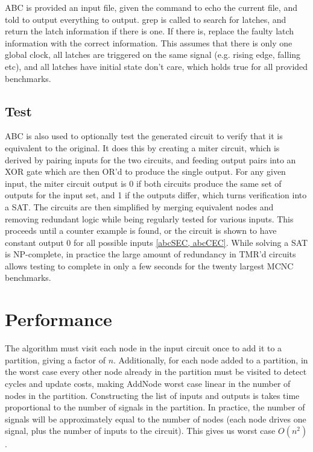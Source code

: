 \documentclass[12pt,final,oneside]{dwThesis} %
\begin{document}
   \gls{ABC} is provided an input file, given the command to echo the current
   file, and told to output everything to output.  grep is called to search for
   latches, and return the latch information if there is one. If there is,
   replace the faulty latch information with the correct information.  This
   assumes that there is only one global clock, all latches are triggered on
   the same signal (e.g. rising edge, falling etc), and all latches have
   initial state don't care, which holds true for all provided benchmarks.


   \subsection{Test}
   \label{algTest} \gls{ABC} is also used to optionally test
   the generated circuit to verify that it is equivalent to the original. It
   does this by creating a miter circuit, which is derived by pairing inputs
   for the two circuits, and feeding output pairs into an XOR gate which are
   then OR'd to produce the single output. For any given input, the miter
   circuit output is 0 if both circuits produce the same set of outputs for the
   input set, and 1 if the outputs differ, which turns verification into a
   \gls{SAT}.  The circuits are then simplified by merging equivalent nodes and
   removing redundant logic while being regularly tested for various inputs.
   This proceeds until a counter example is found, or the circuit is shown to
   have constant output 0 for all possible inputs \ref{abcSEC, abcCEC}.  While
   solving a \gls{SAT} is NP-complete, in practice the large amount of
   redundancy in \gls{TMR}'d circuits allows testing to complete in only a few
   seconds for the twenty largest \gls{MCNC} benchmarks.


   \section{Performance}
   The algorithm must visit each node in the input
   circuit once to add it to a partition, giving a factor of $n$.
   Additionally, for each node added to a partition, in the worst case every
   other node already in the partition must be visited to detect cycles and
   update costs, making AddNode worst case linear in the number of nodes in the
   partition.  Constructing the list of inputs and outputs is takes time
   proportional to the number of signals in the partition. In practice, the
   number of signals will be approximately equal to the number of nodes (each
   node drives one signal, plus the number of inputs to the circuit).  This
   gives us worst case $O(n^2)$.
   
\end{document}
